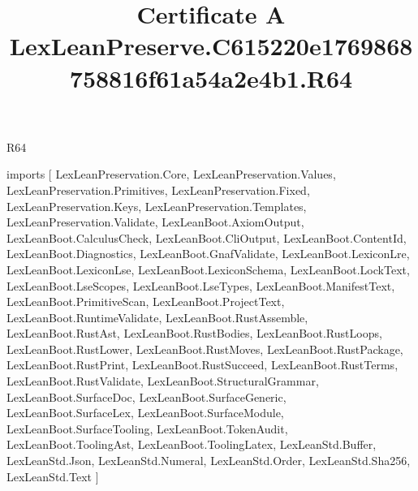 \begin{lexlean}{R64}
\title{Certificate A LexLeanPreserve.C615220e1769868758816f61a54a2e4b1.R64}
\begin{coremodule}
imports [
  LexLeanPreservation.Core,
  LexLeanPreservation.Values,
  LexLeanPreservation.Primitives,
  LexLeanPreservation.Fixed,
  LexLeanPreservation.Keys,
  LexLeanPreservation.Templates,
  LexLeanPreservation.Validate,
  LexLeanBoot.AxiomOutput,
  LexLeanBoot.CalculusCheck,
  LexLeanBoot.CliOutput,
  LexLeanBoot.ContentId,
  LexLeanBoot.Diagnostics,
  LexLeanBoot.GnafValidate,
  LexLeanBoot.LexiconLre,
  LexLeanBoot.LexiconLse,
  LexLeanBoot.LexiconSchema,
  LexLeanBoot.LockText,
  LexLeanBoot.LseScopes,
  LexLeanBoot.LseTypes,
  LexLeanBoot.ManifestText,
  LexLeanBoot.PrimitiveScan,
  LexLeanBoot.ProjectText,
  LexLeanBoot.RuntimeValidate,
  LexLeanBoot.RustAssemble,
  LexLeanBoot.RustAst,
  LexLeanBoot.RustBodies,
  LexLeanBoot.RustLoops,
  LexLeanBoot.RustLower,
  LexLeanBoot.RustMoves,
  LexLeanBoot.RustPackage,
  LexLeanBoot.RustPrint,
  LexLeanBoot.RustSucceed,
  LexLeanBoot.RustTerms,
  LexLeanBoot.RustValidate,
  LexLeanBoot.StructuralGrammar,
  LexLeanBoot.SurfaceDoc,
  LexLeanBoot.SurfaceGeneric,
  LexLeanBoot.SurfaceLex,
  LexLeanBoot.SurfaceModule,
  LexLeanBoot.SurfaceTooling,
  LexLeanBoot.TokenAudit,
  LexLeanBoot.ToolingAst,
  LexLeanBoot.ToolingLatex,
  LexLeanStd.Buffer,
  LexLeanStd.Json,
  LexLeanStd.Numeral,
  LexLeanStd.Order,
  LexLeanStd.Sha256,
  LexLeanStd.Text
]


\end{coremodule}
\end{lexlean}
